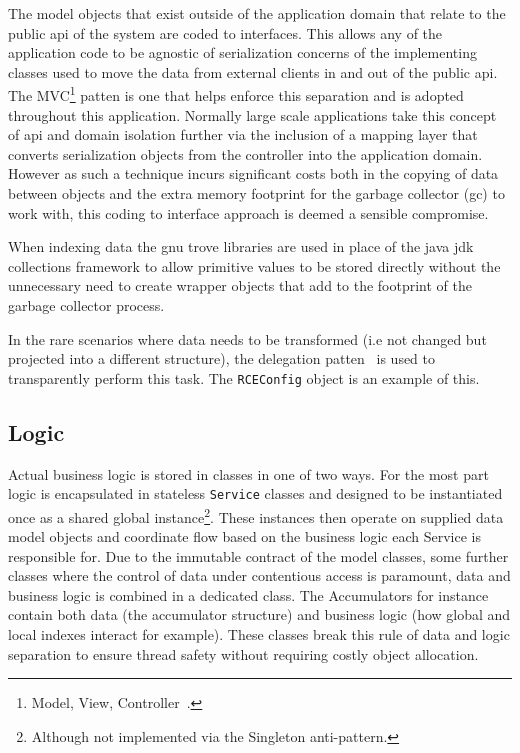 \documentclass[a4paper,11pt]{scrreprt}
\begin{document}
The model objects that exist outside of the application domain that relate to the public \acrshort{api} of the system are coded to interfaces. This allows any of the application code to be agnostic of serialization concerns of the implementing classes used to move the data from external clients in and out of the public \acrshort{api}. The MVC\footnote{Model, View, Controller~\cite{mvc}.} patten is one that helps enforce this separation and is adopted throughout this application. Normally large scale applications take this concept of \acrshort{api} and domain isolation further via the inclusion of a mapping layer that converts serialization objects from the controller into the application domain. However as such a technique incurs significant costs both in the copying of data between objects and the extra memory footprint for the garbage collector (\acrshort{gc}) to work with, this coding to interface approach is deemed a sensible compromise. 

When indexing data the gnu trove libraries are used in place of the java \acrshort{jdk} collections framework to allow primitive values to be stored directly without the unnecessary need to create wrapper objects that add to the footprint of the garbage collector process.

In the rare scenarios where data needs to be transformed (i.e not changed but projected into a different structure), the delegation patten~\cite{design-patterns} is used to transparently perform this task. The \verb|RCEConfig| object is an example of this.
\subsection{Logic}
Actual business logic is stored in classes in one of two ways. For the most part logic is encapsulated in stateless \verb|Service| classes and designed to be instantiated once as a shared global instance\footnote{Although not implemented via the Singleton anti-pattern.}. These instances then operate on supplied data model objects and coordinate flow based on the business logic each Service is responsible for. Due to the immutable contract of the model classes, some further classes where the control of data under contentious access is paramount, data and business logic is combined in a dedicated class. The Accumulators for instance contain both data (the accumulator structure) and business logic (how global and local indexes interact for example). These classes break this rule of data and logic separation to ensure thread safety without requiring costly object allocation. 
\end{document}
